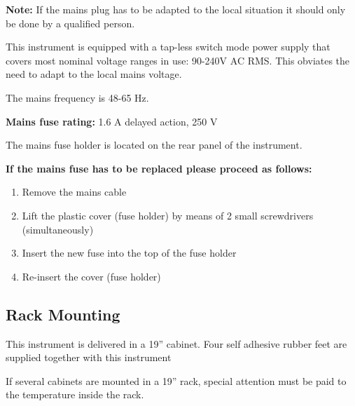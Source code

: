 \textbf{Note:}
If the mains plug has to be adapted to the local situation it should only be done by a qualified
person.

This instrument is equipped with a tap-less switch mode power supply that covers most nominal
voltage ranges in use: 90-240V AC RMS. This obviates the need to adapt to the local mains voltage.

The mains frequency is 48-65 Hz.

\begin{center}
\end{center}

\textbf{Mains fuse rating:} 1.6 A delayed action, 250 V

The mains fuse holder is located on the rear panel of the instrument.

\textbf{If the mains fuse has to be replaced please proceed as follows:}
\begin{enumerate}
\item Remove the mains cable
\item Lift the plastic cover (fuse holder) by means of 2 small screwdrivers (simultaneously)
\item Insert the new fuse into the top of the fuse holder
\item Re-insert the cover (fuse holder)
\end{enumerate}

\begin{center}
\end{center}

\subsection{Rack Mounting}
This instrument is delivered in a 19'' cabinet. Four self adhesive rubber feet are supplied together with this instrument

If several cabinets are mounted in a 19'' rack, special attention must be paid to the temperature inside the rack.

